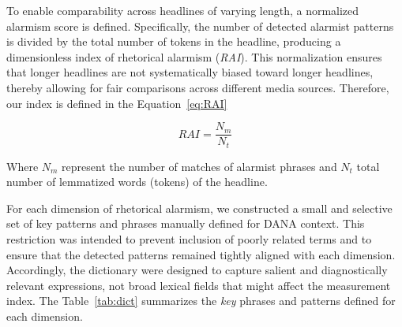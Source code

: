 To enable comparability across headlines of varying length, a normalized alarmism score is defined. 
Specifically, the number of detected alarmist patterns is divided by the total number of tokens in the headline, 
producing a dimensionless index of rhetorical alarmism (\emph{RAI}). This normalization ensures that longer headlines are not systematically 
biased toward longer headlines, thereby allowing for fair comparisons across different media sources. Therefore, our index is defined in the Equation~\ref{eq:RAI}

\begin{equation}
    RAI = \frac{N_m}{N_t}
    \label{eq:RAI}
\end{equation}

Where $N_m$ represent the number of matches of alarmist phrases and $N_t$ total number of lemmatized words (tokens) of the headline.

For each dimension of rhetorical alarmism, we constructed a small and selective set of key patterns and phrases manually defined for DANA context. 
This restriction was intended to prevent inclusion of poorly related terms and to ensure that the detected patterns remained 
tightly aligned with each dimension. Accordingly, the dictionary were designed to capture salient and diagnostically relevant expressions, 
not broad lexical fields that might affect the measurement index. The Table~\ref{tab:dict} summarizes the \emph{key} phrases and patterns defined for each dimension.

